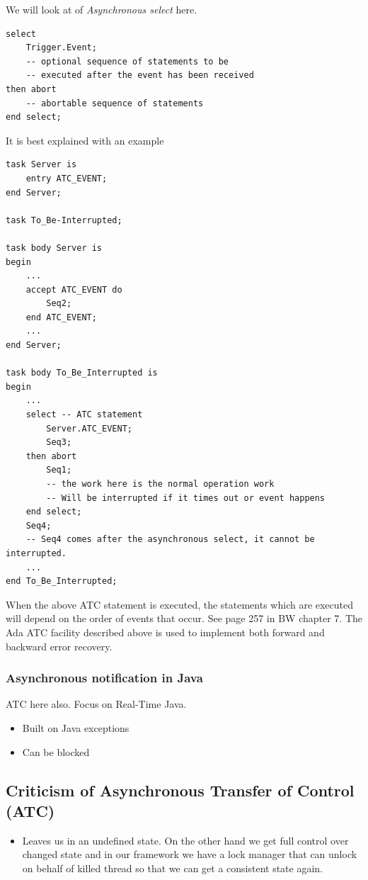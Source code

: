 We will look at of \textit{Asynchronous select} here. 
\newpage
\begin{lstlisting}
select
    Trigger.Event;
    -- optional sequence of statements to be 
    -- executed after the event has been received
then abort
    -- abortable sequence of statements
end select;
\end{lstlisting}
It is best explained with an example
\begin{lstlisting}
task Server is
	entry ATC_EVENT;
end Server;

task To_Be-Interrupted;

task body Server is
begin
	...
    accept ATC_EVENT do 
    	Seq2; 
    end ATC_EVENT;
    ...
end Server;

task body To_Be_Interrupted is
begin
	...
    select -- ATC statement
    	Server.ATC_EVENT;
        Seq3;
    then abort
    	Seq1; 
        -- the work here is the normal operation work
        -- Will be interrupted if it times out or event happens
    end select;
    Seq4;
    -- Seq4 comes after the asynchronous select, it cannot be interrupted.
    ...
end To_Be_Interrupted;
\end{lstlisting}
When the above ATC statement is executed, the statements which are executed will depend on the order of events that occur. See page 257 in BW chapter 7. The Ada ATC facility described above is used to implement both forward and backward error recovery.

\newpage

\subsubsection{Asynchronous notification in Java}
ATC here also. Focus on Real-Time Java.
\begin{itemize}
\item Built on Java exceptions
\item Can be blocked
\end{itemize}

\subsection{Criticism of Asynchronous Transfer of Control (ATC) }
\begin{itemize}
\item Leaves us in an undefined state. On the other hand we get full control over changed state and in our framework we have a lock manager that can unlock on behalf of killed thread so that we can get a consistent state again.
\end{itemize}




